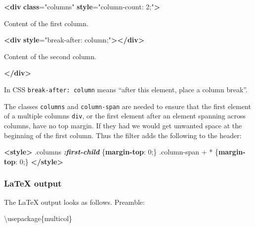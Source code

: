 \documentclass[
]{article}
\newenvironment{Shaded}{}{}
\newcommand{\BuiltInTok}[1]{#1}
\newcommand{\DecValTok}[1]{\textcolor[rgb]{0.25,0.63,0.44}{#1}}
\newcommand{\ErrorTok}[1]{\textcolor[rgb]{1.00,0.00,0.00}{\textbf{#1}}}
\newcommand{\ExtensionTok}[1]{#1}
\newcommand{\FunctionTok}[1]{\textcolor[rgb]{0.02,0.16,0.49}{#1}}
\newcommand{\InformationTok}[1]{\textcolor[rgb]{0.38,0.63,0.69}{\textbf{\textit{#1}}}}
\newcommand{\KeywordTok}[1]{\textcolor[rgb]{0.00,0.44,0.13}{\textbf{#1}}}
\newcommand{\NormalTok}[1]{#1}
\newcommand{\OperatorTok}[1]{\textcolor[rgb]{0.40,0.40,0.40}{#1}}
\newcommand{\OtherTok}[1]{\textcolor[rgb]{0.00,0.44,0.13}{#1}}
\newcommand{\StringTok}[1]{\textcolor[rgb]{0.25,0.44,0.63}{#1}}
\begin{document}
\begin{Shaded}
\begin{Highlighting}[]
\KeywordTok{\textless{}div} \ErrorTok{class}\OtherTok{=}\StringTok{"columns"} \ErrorTok{style}\OtherTok{=}\StringTok{"column{-}count: 2;"}\KeywordTok{\textgreater{}}

\NormalTok{Content of the first column.}

\KeywordTok{\textless{}div} \ErrorTok{style}\OtherTok{=}\StringTok{"break{-}after: column;"}\KeywordTok{\textgreater{}\textless{}/div\textgreater{}}

\NormalTok{Content of the second column.}

\KeywordTok{\textless{}/div\textgreater{}}
\end{Highlighting}
\end{Shaded}

In CSS \texttt{break-after:\ column} means ``after this element, place a
column break''.

The classes \texttt{columns} and \texttt{column-span} are needed to
ensure that the first element of a multiple columns \texttt{div}, or the
first element after an element spanning across columns, have no top
margin. If they had we would get unwanted space at the beginning of the
first column. Thus the filter adds the following to the header:

\begin{Shaded}
\begin{Highlighting}[]
  \KeywordTok{\textless{}style\textgreater{}}
    \FunctionTok{.columns} \InformationTok{:first{-}child}\NormalTok{ \{}\KeywordTok{margin{-}top}\NormalTok{: }\DecValTok{0}\OperatorTok{;}\NormalTok{\}}
    \FunctionTok{.column{-}span} \OperatorTok{+} \OperatorTok{*}\NormalTok{ \{}\KeywordTok{margin{-}top}\NormalTok{: }\DecValTok{0}\OperatorTok{;}\NormalTok{\}}
  \KeywordTok{\textless{}/style\textgreater{}}
\end{Highlighting}
\end{Shaded}

\hypertarget{latex-output}{%
\subsubsection{LaTeX output}\label{latex-output}}

The LaTeX output looks as follows. Preamble:

\begin{Shaded}
\begin{Highlighting}[]
\BuiltInTok{\textbackslash{}usepackage}\NormalTok{\{}\ExtensionTok{multicol}\NormalTok{\}}
\end{Highlighting}
\end{Shaded}
\end{document}
